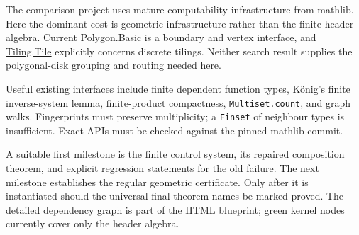 \documentclass[11pt,a4paper]{article}
\theoremstyle{remark}
\begin{document}
The comparison project uses mature computability infrastructure from
mathlib. Here the dominant cost is geometric infrastructure rather than
the finite header algebra. Current
\href{https://leanprover-community.github.io/mathlib4_docs/Mathlib/Geometry/Polygon/Basic.html}
{Polygon.Basic} is a boundary and vertex interface, and
\href{https://leanprover-community.github.io/mathlib4_docs/Mathlib/Combinatorics/Tiling/Tile.html}
{Tiling.Tile} explicitly concerns discrete tilings. Neither search result
supplies the polygonal-disk grouping and routing needed here.

Useful existing interfaces include finite dependent function types,
K\"onig's finite inverse-system lemma, finite-product compactness,
\texttt{Multiset.count}, and graph walks. Fingerprints must preserve
multiplicity; a \texttt{Finset} of neighbour types is insufficient.
Exact APIs must be checked against the pinned mathlib commit.

A suitable first milestone is the finite control system, its repaired
composition theorem, and explicit regression statements for the old
failure. The next milestone establishes the regular geometric certificate.
Only after it is instantiated should the universal final theorem names
be marked proved. The detailed dependency graph is part of the HTML
blueprint; green kernel nodes currently cover only the header algebra.
\end{document}
